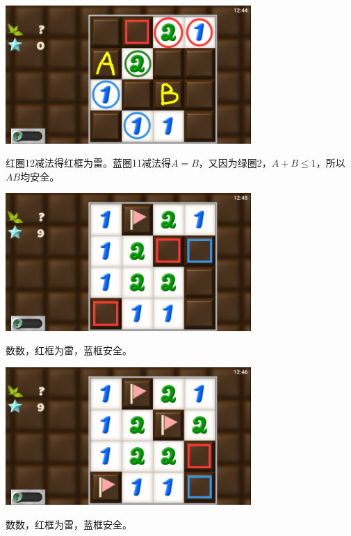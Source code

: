 \subsection{} %
\begin{center}
    \includegraphics[width=0.7\textwidth]{puzzle/134-1.png}
\end{center}
红圈12减法得红框为雷。蓝圈11减法得$A=B$，又因为绿圈2，$A+B\le 1$，所以$AB$均安全。
\begin{center}
    \includegraphics[width=0.7\textwidth]{puzzle/134-2.png}
\end{center}
数数，红框为雷，蓝框安全。
\begin{center}
    \includegraphics[width=0.7\textwidth]{puzzle/134-3.png}
\end{center}
数数，红框为雷，蓝框安全。

